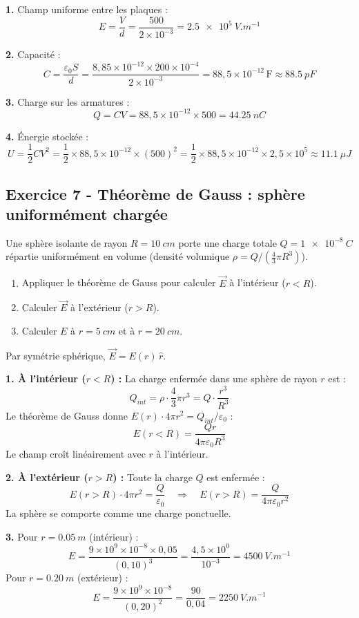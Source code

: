 \documentclass[12pt,a4paper]{article}
\begin{document}
\begin{boitecorrige}
\textbf{1.} Champ uniforme entre les plaques :
\[
E = \frac{V}{d} = \frac{500}{2\times10^{-3}} = \qty{2.5e5}{V.m^{-1}}
\]

\textbf{2.} Capacité :
\[
C = \frac{\varepsilon_0 S}{d} = \frac{8{,}85\times10^{-12}\times200\times10^{-4}}{2\times10^{-3}}
= 88{,}5\times10^{-12}\,\text{F} \approx \qty{88.5}{pF}
\]

\textbf{3.} Charge sur les armatures :
\[
Q = CV = 88{,}5\times10^{-12}\times500 = \qty{44.25}{nC}
\]

\textbf{4.} Énergie stockée :
\[
U = \frac{1}{2}CV^2 = \frac{1}{2}\times88{,}5\times10^{-12}\times(500)^2 = \frac{1}{2}\times88{,}5\times10^{-12}\times2{,}5\times10^5 \approx \qty{11.1}{\mu J}
\]
\end{boitecorrige}

\subsection*{Exercice 7 - Théorème de Gauss : sphère uniformément chargée \niveau{\moyen}}

\begin{boiteexercice}
Une sphère isolante de rayon $R = \qty{10}{cm}$ porte une charge totale $Q = \qty{1e-8}{C}$ répartie uniformément en volume (densité volumique $\rho = Q/(\frac{4}{3}\pi R^3)$).
\begin{enumerate}
  \item Appliquer le théorème de Gauss pour calculer $\vec{E}$ à l'intérieur ($r < R$).
  \item Calculer $\vec{E}$ à l'extérieur ($r > R$).
  \item Calculer $E$ à $r = \qty{5}{cm}$ et à $r = \qty{20}{cm}$.
\end{enumerate}
\end{boiteexercice}

\begin{boitecorrige}
Par symétrie sphérique, $\vec{E} = E(r)\,\hat{r}$.

\textbf{1. À l'intérieur ($r < R$) :} La charge enfermée dans une sphère de rayon $r$ est :
\[
Q_{int} = \rho \cdot \frac{4}{3}\pi r^3 = Q\cdot\frac{r^3}{R^3}
\]
Le théorème de Gauss donne $E(r)\cdot 4\pi r^2 = Q_{int}/\varepsilon_0$ :
\[
\boxed{E(r<R) = \frac{Qr}{4\pi\varepsilon_0 R^3}}
\]
Le champ croît linéairement avec $r$ à l'intérieur.

\textbf{2. À l'extérieur ($r > R$) :} Toute la charge $Q$ est enfermée :
\[
E(r>R)\cdot 4\pi r^2 = \frac{Q}{\varepsilon_0} \quad \Rightarrow \quad \boxed{E(r>R) = \frac{Q}{4\pi\varepsilon_0 r^2}}
\]
La sphère se comporte comme une charge ponctuelle.

\textbf{3.} Pour $r = \qty{0.05}{m}$ (intérieur) :
\[
E = \frac{9\times10^9\times10^{-8}\times0{,}05}{(0{,}10)^3} = \frac{4{,}5\times10^0}{10^{-3}} = \qty{4500}{V.m^{-1}}
\]
Pour $r = \qty{0.20}{m}$ (extérieur) :
\[
E = \frac{9\times10^9\times10^{-8}}{(0{,}20)^2} = \frac{90}{0{,}04} = \qty{2250}{V.m^{-1}}
\]
\end{boitecorrige}
\end{document}
